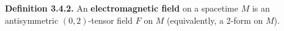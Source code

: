 \textbf{Definition 3.4.2.} An \textbf{electromagnetic field} on a spacetime $M$ is an antisymmetric $(0,2)$-tensor field $F$ on $M$ (equivalently, a 2-form on $M$).
